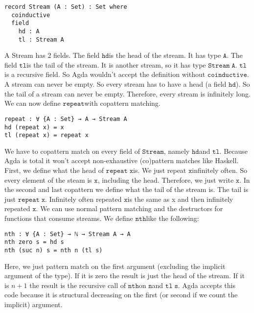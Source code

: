\documentclass[a4paper,cleardoubleempty,BCOR1cm]{scrbook}
\begin{document}
\begin{verbatim}
record Stream (A : Set) : Set where
  coinductive
  field
    hd : A
    tl : Stream A
\end{verbatim}

A Stream has 2 fields. The field $\mathtt{hd}$\;is the head of the stream. It has type
$\mathtt{A}$. The field $\mathtt{tl}$\;is the tail of the stream. It is another stream, so it
has type $\mathtt{Stream\;A}$. $\mathtt{tl}$\;is a recursive field. So Agda wouldn't accept the
definition without $\mathtt{coinductive}$. A stream can never be empty. So every stream
has to have a head (a field $\mathtt{hd}$). So the
tail of a stream can never be empty. Therefore, every stream is infinitely
long. We can now define $\mathtt{repeat}$\;with copattern matching.

\begin{verbatim}
repeat : ∀ {A : Set} → A → Stream A
hd (repeat x) = x
tl (repeat x) = repeat x
\end{verbatim}

We have to copattern match on every field of $\mathtt{Stream}$, namely $\mathtt{hd}$\;and $\mathtt{tl}$.
Because Agda is total it won't accept non-exhaustive (co)pattern matches
like Haskell.  First, we define what the head of $\mathtt{repeat\;x}$\;is.  We just
repeat $\mathtt{x}$\;infinitely often.  So every element of the steam is $\mathtt{x}$, including
the head.  Therefore, we just write $\mathtt{x}$.  In the second and last copattern we
define what the tail of the stream is.  The tail is just $\mathtt{repeat\;x}$.
Infinitely often repeated $\mathtt{x}$\;is the same as x and then infinitely repeated
$\mathtt{x}$.  We can use normal pattern matching and the destructors for functions
that consume streams.  We define $\mathtt{nth}$\;like the following:

\begin{verbatim}
nth : ∀ {A : Set} → ℕ → Stream A → A
nth zero s = hd s
nth (suc n) s = nth n (tl s)
\end{verbatim}

Here, we just pattern match on the first argument (excluding the implicit
argument of the type).  If it is zero the result is just the head of the
stream.  If it is \(n+1\) the result is the recursive call of $\mathtt{nth}$\;on $\mathtt{n}$\;and
$\mathtt{tl\;s}$.  Agda accepts this code because it is structural decreasing on the
first (or second if we count the implicit) argument.
\end{document}
